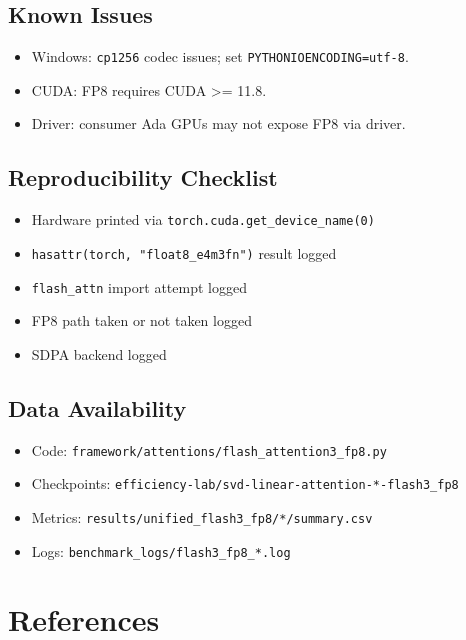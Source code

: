 \subsection{Known Issues}

\begin{itemize}
\item Windows: \texttt{cp1256} codec issues; set \texttt{PYTHONIOENCODING=utf-8}.
\item CUDA: FP8 requires CUDA >= 11.8.
\item Driver: consumer Ada GPUs may not expose FP8 via driver.

\end{itemize}
\subsection{Reproducibility Checklist}

\begin{itemize}
\item [ ] Hardware printed via \texttt{torch.cuda.get\_device\_name(0)}
\item [ ] \texttt{hasattr(torch, "float8\_e4m3fn")} result logged
\item [ ] \texttt{flash\_attn} import attempt logged
\item [ ] FP8 path taken or not taken logged
\item [ ] SDPA backend logged

\end{itemize}
\subsection{Data Availability}

\begin{itemize}
\item Code: \texttt{framework/attentions/flash\_attention3\_fp8.py}
\item Checkpoints: \texttt{efficiency-lab/svd-linear-attention-*-flash3\_fp8}
\item Metrics: \texttt{results/unified\_flash3\_fp8/*/summary.csv}
\item Logs: \texttt{benchmark\_logs/flash3\_fp8\_*.log}

\end{itemize}



\section{References}

